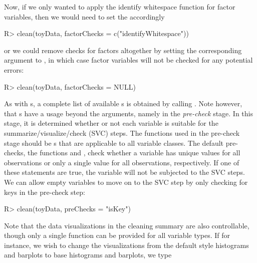 \documentclass[article,shortnames]{jss}
\begin{document}
Now, if we only wanted to apply the identify whitespace function for
factor variables, then we would need to set the  accordingly

\begin{Schunk}
\begin{Sinput}
R> clean(toyData, factorChecks = c("identifyWhitespace"))
\end{Sinput}
\end{Schunk}

or we could remove checks for factors altogether by setting the
corresponding argument to , in which case factor variables will
not be checked for any potential errors:

\begin{Schunk}
\begin{Sinput}
R> clean(toyData, factorChecks = NULL)
\end{Sinput}
\end{Schunk}

As with s, a complete list of available
s is obtained by calling
. Note however, that s have a
usage beyond the  arguments, namely in the
\textit{pre-check} stage. In this stage, it is determined whether or
not each variable is suitable for the summarize/visualize/check (SVC)
steps. The functions used in the pre-check stage should be
s that are applicable to all variable classes. The
default pre-checks, the functions  and , check
whether a variable has unique values for all observations or only a
single value for all observations, respectively. If one of these
statements are true, the variable will not be subjected to the SVC
steps.  We can allow empty variables to move on to the SVC step by
only checking for keys in the pre-check step:

\begin{Schunk}
\begin{Sinput}
R> clean(toyData, preChecks = "isKey")
\end{Sinput}
\end{Schunk}

Note that the data visualizations in the cleaning summary are also
controllable, though only a single function can be provided for all
variable types. If for instance, we wish to change the visualizations
from the default  \citep{ggplot2} style histograms and barplots to base
 histograms and barplots, we type
\end{document}
